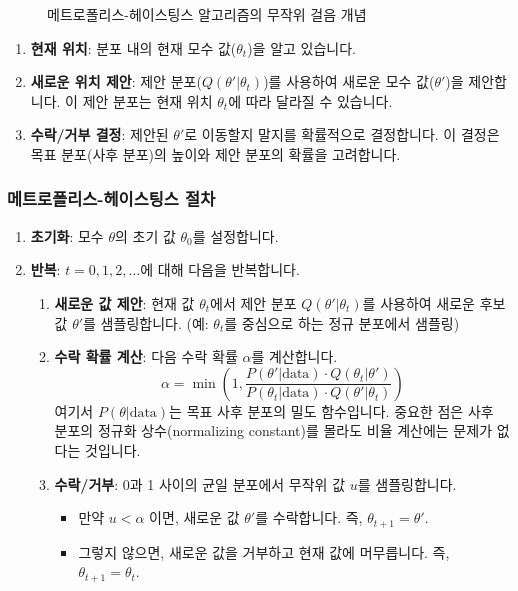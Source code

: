 \documentclass[11pt,a4paper]{book}
\theoremstyle{definition}
\begin{document}
\begin{figure}[h!]
    \centering
    \caption{메트로폴리스-헤이스팅스 알고리즘의 무작위 걸음 개념}
    \label{fig:metropolis_hastings_walk}
\end{figure}

\begin{infobox}[title=메트로폴리스-헤이스팅스 알고리즘의 핵심 아이디어]
\begin{enumerate}
    \item \textbf{현재 위치}: 분포 내의 현재 모수 값($\theta_t$)을 알고 있습니다.
    \item \textbf{새로운 위치 제안}: 제안 분포($Q(\theta' | \theta_t)$)를 사용하여 새로운 모수 값($\theta'$)을 제안합니다. 이 제안 분포는 현재 위치 $\theta_t$에 따라 달라질 수 있습니다.
    \item \textbf{수락/거부 결정}: 제안된 $\theta'$로 이동할지 말지를 확률적으로 결정합니다. 이 결정은 목표 분포(사후 분포)의 높이와 제안 분포의 확률을 고려합니다.
\end{enumerate}
\end{infobox}

\subsubsection*{메트로폴리스-헤이스팅스 절차}
\begin{enumerate}
    \item \textbf{초기화}: 모수 $\theta$의 초기 값 $\theta_0$를 설정합니다.
    \item \textbf{반복}: $t=0, 1, 2, \dots$에 대해 다음을 반복합니다.
    \begin{enumerate}
        \item \textbf{새로운 값 제안}: 현재 값 $\theta_t$에서 제안 분포 $Q(\theta' | \theta_t)$를 사용하여 새로운 후보 값 $\theta'$를 샘플링합니다. (예: $\theta_t$를 중심으로 하는 정규 분포에서 샘플링)
        \item \textbf{수락 확률 계산}: 다음 수락 확률 $\alpha$를 계산합니다.
        \[ \alpha = \min \left( 1, \frac{P(\theta' | \text{data}) \cdot Q(\theta_t | \theta')}{P(\theta_t | \text{data}) \cdot Q(\theta' | \theta_t)} \right) \]
        여기서 $P(\theta | \text{data})$는 목표 사후 분포의 밀도 함수입니다. 중요한 점은 사후 분포의 정규화 상수(normalizing constant)를 몰라도 비율 계산에는 문제가 없다는 것입니다.
        \item \textbf{수락/거부}: 0과 1 사이의 균일 분포에서 무작위 값 $u$를 샘플링합니다.
        \begin{itemize}
            \item 만약 $u < \alpha$ 이면, 새로운 값 $\theta'$를 수락합니다. 즉, $\theta_{t+1} = \theta'$.
            \item 그렇지 않으면, 새로운 값을 거부하고 현재 값에 머무릅니다. 즉, $\theta_{t+1} = \theta_t$.
        \end{itemize}
    \end{enumerate}
\end{enumerate}
\end{document}
